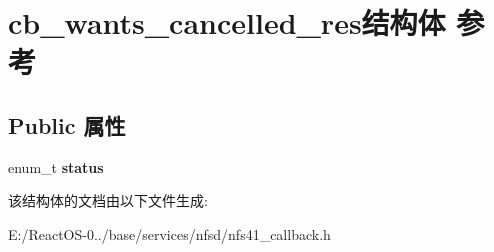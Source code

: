\hypertarget{structcb__wants__cancelled__res}{}\section{cb\+\_\+wants\+\_\+cancelled\+\_\+res结构体 参考}
\label{structcb__wants__cancelled__res}
\subsection*{Public 属性}
\begin{DoxyCompactItemize}
\item 
\mbox{\label{structcb__wants__cancelled__res_ad8c52473a6712f306e01deef647e5e19}} 
enum\+\_\+t {\bfseries status}
\end{DoxyCompactItemize}


该结构体的文档由以下文件生成\+:\begin{DoxyCompactItemize}
\item 
E\+:/\+React\+O\+S-\/0../base/services/nfsd/nfs41\+\_\+callback.\+h\end{DoxyCompactItemize}

